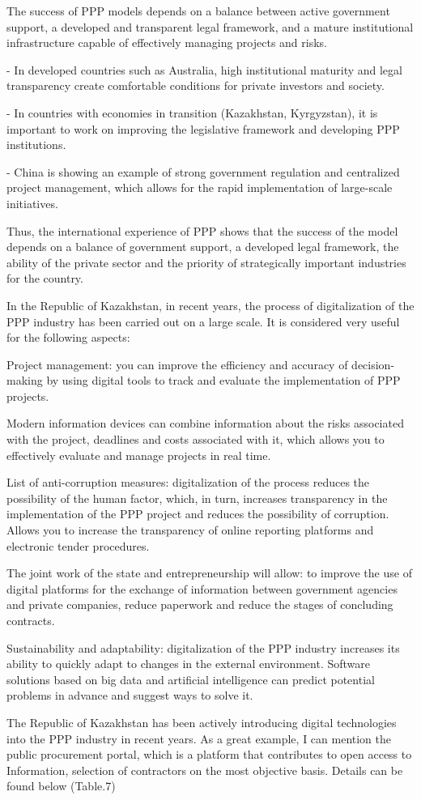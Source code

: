 \begin{multicols}{2}
The success of PPP models depends on a balance between active government
support, a developed and transparent legal framework, and a mature
institutional infrastructure capable of effectively managing projects
and risks.

- In developed countries such as Australia, high institutional maturity
and legal transparency create comfortable conditions for private
investors and society.

- In countries with economies in transition (Kazakhstan, Kyrgyzstan), it
is important to work on improving the legislative framework and
developing PPP institutions.

- China is showing an example of strong government regulation and
centralized project management, which allows for the rapid
implementation of large-scale initiatives.

Thus, the international experience of PPP shows that the success of the
model depends on a balance of government support, a developed legal
framework, the ability of the private sector and the priority of
strategically important industries for the country.

In the Republic of Kazakhstan, in recent years, the process of
digitalization of the PPP industry has been carried out on a large
scale. It is considered very useful for the following aspects:

Project management: you can improve the efficiency and accuracy of
decision-making by using digital tools to track and evaluate the
implementation of PPP projects.

Modern information devices can combine information about the risks
associated with the project, deadlines and costs associated with it,
which allows you to effectively evaluate and manage projects in real
time.

List of anti-corruption measures: digitalization of the process reduces
the possibility of the human factor, which, in turn, increases
transparency in the implementation of the PPP project and reduces the
possibility of corruption. Allows you to increase the transparency of
online reporting platforms and electronic tender procedures.

The joint work of the state and entrepreneurship will allow: to improve
the use of digital platforms for the exchange of information between
government agencies and private companies, reduce paperwork and reduce
the stages of concluding contracts.

Sustainability and adaptability: digitalization of the PPP industry
increases its ability to quickly adapt to changes in the external
environment. Software solutions based on big data and artificial
intelligence can predict potential problems in advance and suggest ways
to solve it.

The Republic of Kazakhstan has been actively introducing digital
technologies into the PPP industry in recent years. As a great example,
I can mention the public procurement portal, which is a platform that
contributes to open access to Information, selection of contractors on
the most objective basis. Details can be found below (Table.7)
\end{multicols}

